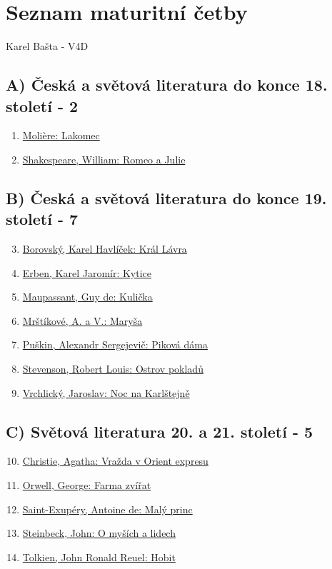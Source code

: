 \documentclass[a4paper,11pt]{article}
\begin{document}

\section*{Seznam maturitní četby}
\begin{center}
    \Large Karel Bašta - V4D
\end{center}
\subsection*{A)	Česká a světová literatura do konce 18. století - 2}
\begin{enumerate}
    \item \hyperref[sec:lakomec]{Molière: Lakomec}
    \item \hyperref[sec:romeoajulie]{Shakespeare, William: Romeo a Julie}
\end{enumerate}
\subsection*{B)	Česká a světová literatura do konce 19. století - 7}
\begin{enumerate}
    \setcounter{enumi}{2}
    \item \hyperref[sec:krallavra]{Borovský, Karel Havlíček: Král Lávra}
    \item \hyperref[sec:kytice]{Erben, Karel Jaromír: Kytice}
    \item \hyperref[sec:kulicka]{Maupassant, Guy de: Kulička}
    \item \hyperref[sec:marysa]{Mrštíkové, A. a V.: Maryša}
    \item \hyperref[sec:pikovadama]{Puškin, Alexandr Sergejevič: Piková dáma}
    \item \hyperref[sec:ostrovpokladu]{Stevenson, Robert Louis: Ostrov pokladů}
    \item \hyperref[sec:nocnakarlstejne]{Vrchlický, Jaroslav: Noc na Karlštejně}
\end{enumerate}
\subsection*{C)	Světová literatura 20. a 21. století - 5}
\begin{enumerate}
    \setcounter{enumi}{9}
    \item \hyperref[sec:orientexpres]{Christie, Agatha: Vražda v Orient expresu}
    \item \hyperref[sec:farmazvirat]{Orwell, George: Farma zvířat}
    \item \hyperref[sec:malyprinc]{Saint-Exupéry, Antoine de: Malý princ}
    \item \hyperref[sec:omysichalidech]{Steinbeck, John: O myších a lidech}
    \item \hyperref[sec:hobit]{Tolkien, John Ronald Reuel: Hobit}
\end{enumerate}
\end{document}
